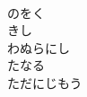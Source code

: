 \documentclass[10pt,b5j]{tarticle} %
\begin{document}
\begin{enumerate}
\begin{minipage}[c]{\blocksize}
        \vspace{\linespace}
        \item~\\
        のをく\\
        きし\\
        わぬらにし\\
        たなる\\
        ただにじもう
    
    \end{minipage}
\end{enumerate} %
\end{document}
